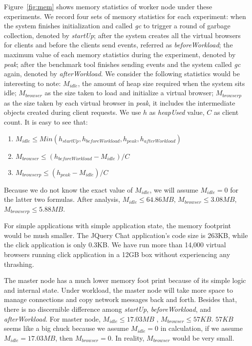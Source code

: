 Figure~\ref{fig:mem} shows memory statistics of worker node under these experiments.
We record four sets of memory statistics for each experiment: 
when the system finishes initialization and called \emph{gc} to trigger a round of garbage collection,
denoted by \emph{startUp};
after the system creates all the virtual browsers for clients and before the clients send 
events, referred as \emph{beforeWorkload};
the maximum value of each memory statistics during the experiment, denoted by \emph{peak};
after the benchmark tool finishes sending events and the system called \emph{gc} again,
denoted by \emph{afterWorkload}.
We consider the following statistics would be interesting to note:
$M_{idle}$, the amount of heap size required when the system sits idle;
$M_{browser}$ as the size taken to load and initialize a virtual browser;
$M_{browserp}$ as the size taken by each virtual browser in \emph{peak}, 
it includes the intermediate objects created during client requests.
We use $h$ as \emph{heapUsed} value, $C$ as client count.
It is easy to see that:
\begin{enumerate}
\item $M_{idle} \leq Min(h_{startUp}, h_{beforeWorkload}, h_{peak}, h_{afterWorkload})$
\item $M_{browser} \leq (h_{beforeWorkload} - M_{idle})/C$
\item $M_{browserp} \leq (h_{peak} - M_{idle})/C$
\end{enumerate}
Because we do not know the exact value of $M_{idle}$, 
we will assume $M_{idle}=0$ for the latter two formulas.
After analysis, $M_{idle} \leq 64.86MB$, $M_{browser} \leq 3.08MB$, $M_{browserp} \leq 5.88MB$.

For simple applications with simple application state, the memory footprint would be mush smaller.
The JQuery Chat application's code size is 263KB, while the click application is only 0.3KB.
We have run more than 14,000 virtual browsers running click application in a 12GB box without
experiencing any thrashing.

The master node has a much lower memory foot print because of its simple logic
and internal state.
Under workload, the master node will take more space to manage connections and
copy network messages back and forth.
Besides that, there is no discernible difference among \emph{startUp}, \emph{beforeWorkload},
and \emph{afterWorkload}.
For master node,
$M_{idle} \leq 17.03MB$ , $M_{browser} \leq 57KB$.
$57KB$ seems like a big chuck because we assume $M_{idle}=0$ in calculation,
if we assume $M_{idle}=17.03MB$, then $M_{browser} = 0$. 
In reality, $M_{browser}$ would be very small.

